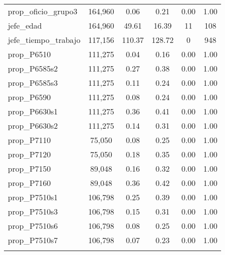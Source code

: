 \begin{table}[!htbp]
\begin{tabular}{@{\extracolsep{5pt}}lccccc}
prop\_oficio\_grupo3 & 164,960 & 0.06 & 0.21 & 0.00 & 1.00 \\ 
jefe\_edad & 164,960 & 49.61 & 16.39 & 11 & 108 \\ 
jefe\_tiempo\_trabajo & 117,156 & 110.37 & 128.72 & 0 & 948 \\ 
prop\_P6510 & 111,275 & 0.04 & 0.16 & 0.00 & 1.00 \\ 
prop\_P6585s2 & 111,275 & 0.27 & 0.38 & 0.00 & 1.00 \\ 
prop\_P6585s3 & 111,275 & 0.11 & 0.24 & 0.00 & 1.00 \\ 
prop\_P6590 & 111,275 & 0.08 & 0.24 & 0.00 & 1.00 \\ 
prop\_P6630s1 & 111,275 & 0.36 & 0.41 & 0.00 & 1.00 \\ 
prop\_P6630s2 & 111,275 & 0.14 & 0.31 & 0.00 & 1.00 \\ 
prop\_P7110 & 75,050 & 0.08 & 0.25 & 0.00 & 1.00 \\ 
prop\_P7120 & 75,050 & 0.18 & 0.35 & 0.00 & 1.00 \\ 
prop\_P7150 & 89,048 & 0.16 & 0.32 & 0.00 & 1.00 \\ 
prop\_P7160 & 89,048 & 0.36 & 0.42 & 0.00 & 1.00 \\ 
prop\_P7510s1 & 106,798 & 0.25 & 0.39 & 0.00 & 1.00 \\ 
prop\_P7510s3 & 106,798 & 0.15 & 0.31 & 0.00 & 1.00 \\ 
prop\_P7510s6 & 106,798 & 0.08 & 0.25 & 0.00 & 1.00 \\ 
prop\_P7510s7 & 106,798 & 0.07 & 0.23 & 0.00 & 1.00 \\ 
\hline \\[-1.8ex] 
\end{tabular} 
\end{table} 
